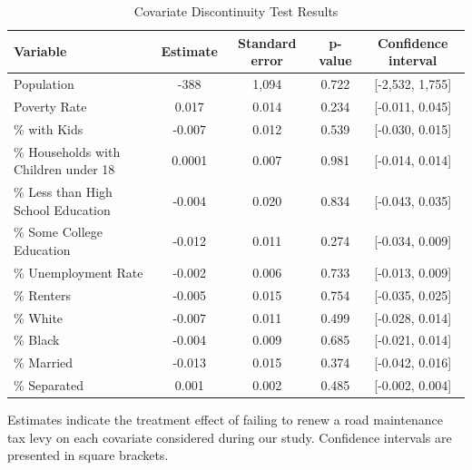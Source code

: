 \begin{table}[!h]
    \centering
    \caption{Covariate Discontinuity Test Results}
    \label{tab:covariate_discontinuity}
    \begin{tabular}{p{2cm}cccc}
        \hline
        Variable & Estimate & Standard error & p-value & Confidence interval \\
        \hline
        Population                           & -388      & 1,094   & 0.722  & [-2,532, 1,755] \\
        Poverty Rate                         & 0.017     & 0.014   & 0.234  & [-0.011, 0.045] \\
        \% with Kids                         & -0.007    & 0.012   & 0.539  & [-0.030, 0.015] \\
        \% Households with Children under 18 & 0.0001    & 0.007   & 0.981  & [-0.014, 0.014] \\
        \% Less than High School Education   & -0.004    & 0.020   & 0.834  & [-0.043, 0.035] \\
        \% Some College Education            & -0.012    & 0.011   & 0.274  & [-0.034, 0.009] \\
        \% Unemployment Rate                 & -0.002    & 0.006   & 0.733  & [-0.013, 0.009] \\
        \% Renters                           & -0.005    & 0.015   & 0.754  & [-0.035, 0.025] \\
        \% White                             & -0.007    & 0.011   & 0.499  & [-0.028, 0.014] \\
        \% Black                             & -0.004    & 0.009   & 0.685  & [-0.021, 0.014] \\
        \% Married                           & -0.013    & 0.015   & 0.374  & [-0.042, 0.016] \\
        \% Separated                         & 0.001     & 0.002   & 0.485  & [-0.002, 0.004] \\
        \hline
    \end{tabular}
    \begin{tablenotes}
        \small
        \item Estimates indicate the treatment effect of failing to renew a road maintenance tax levy on each covariate considered during our study. Confidence intervals are presented in square brackets.
    \end{tablenotes}
\end{table}

